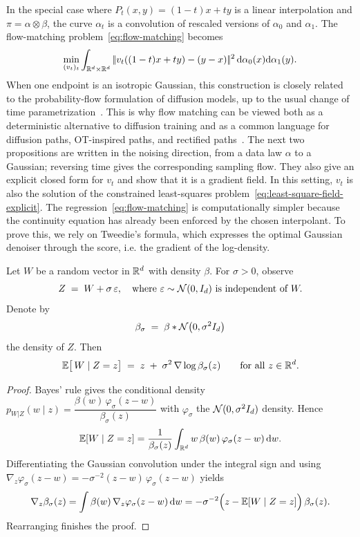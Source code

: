 In the special case where $P_t(x,y)=(1-t)x+ty$ is a linear interpolation and $\pi = \alpha \otimes \beta$, the curve $\alpha_t$ is a convolution of rescaled versions of $\alpha_0$ and $\alpha_1$. The flow-matching problem~\eqref{eq:flow-matching} becomes
\[
    \min_{(v_t)_t} \int_{\mathbb{R}^{d} \times \mathbb{R}^d} |\!| v_t( (1-t)x+t y ) - (y-x)  |\!|^2 \, \mathrm{d}\alpha_0(x) \mathrm{d}\alpha_1(y).
\]
When one endpoint is an isotropic Gaussian, this construction is closely related to the probability-flow formulation of diffusion models, up to the usual change of time parametrization~\cite{Song2021ScoreSDE}. This is why flow matching can be viewed both as a deterministic alternative to diffusion training and as a common language for diffusion paths, OT-inspired paths, and rectified paths~\cite{Lipman2022FlowMatching,Liu2023RectifiedFlow,Albergo2025StochasticInterpolants}. The next two propositions are written in the noising direction, from a data law $\alpha$ to a Gaussian; reversing time gives the corresponding sampling flow. They also give an explicit closed form for $v_t$ and show that it is a gradient field.
%
In this setting, $v_t$ is also the solution of the constrained least-squares problem~\eqref{eq:least-square-field-explicit}. The regression~\eqref{eq:flow-matching} is computationally simpler because the continuity equation has already been enforced by the chosen interpolant.
%
To prove this, we rely on Tweedie's formula, which expresses the optimal Gaussian denoiser through the score, i.e. the gradient of the log-density.

\begin{proposition}\label{prop:Tweedie}
Let $W$ be a random vector in $\mathbb{R}^{d}$ with density $\beta$.
For $\sigma>0$, observe
\[
Z \;=\; W + \sigma\,\varepsilon,
\quad\text{where } \varepsilon \sim \mathcal{N}(0,I_{d})
\text{ is independent of } W .
\]
Denote by
\[
	\beta_\sigma \;=\; \beta * \mathcal{N}\bigl(0,\sigma^{2}I_{d}\bigr)
\]
the density of $Z$.
Then
\[
\mathbb{E}\bigl[\,W \mid Z=z\bigr]
      \;=\; z \;+\;\sigma^{2}\,\nabla \log \beta_\sigma(z)
\qquad\text{for all } z \in \mathbb{R}^{d}.
\]
\end{proposition}

\begin{proof}
Bayes' rule gives the conditional density
$
p_{W|Z}(w\mid z)
= \dfrac{\beta(w)\,\varphi_\sigma(z-w)}{\beta_\sigma(z)}
$
with $\varphi_\sigma$ the $\mathcal{N}(0,\sigma^{2}I_{d})$ density.
Hence
\[
\mathbb{E}[W\mid Z=z]
= \frac{1}{\beta_\sigma(z)}
      \int_{\mathbb{R}^{d}} w\,
             \beta(w)\,\varphi_\sigma(z-w)\,\mathrm{d} w .
\]
Differentiating the Gaussian convolution under the integral sign and using
$
\nabla_z\varphi_\sigma(z-w)
     = -\sigma^{-2}(z-w)\,\varphi_\sigma(z-w)
$
yields
\[
\nabla_z\beta_\sigma(z)
= \int \beta(w)\,\nabla_z\varphi_\sigma(z-w)\,\mathrm{d} w
= -\sigma^{-2}\Bigl(z-\mathbb{E}[W\mid Z=z]\Bigr)\,\beta_\sigma(z).
\]
Rearranging finishes the proof.
\end{proof}


